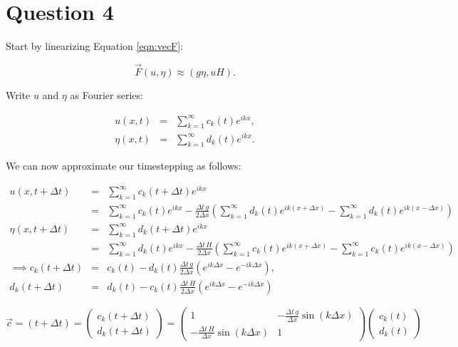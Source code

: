 \documentclass[a4paper,12pt]{article}
\begin{document}
\section{Question 4}

Start by linearizing Equation \ref{eqn:vecF}:

\begin{equation}
\vec{F}(u,\eta) \approx \left(g\eta,uH\right).
\end{equation}

Write $u$ and $\eta$ as Fourier series: 

\begin{eqnarray}
u(x,t) &=& \sum_{k=1}^{\infty}c_k(t) e^{ikx},\nonumber\\
\eta(x,t) &=& \sum_{k=1}^{\infty}d_k(t) e^{ikx}.\nonumber
\end{eqnarray}

We can now approximate our timestepping as follows:

\begin{eqnarray}
u(x,t+\Delta t) &=& \sum_{k=1}^{\infty}c_k(t+\Delta t)e^{ikx}\nonumber\\
&=& \sum_{k=1}^{\infty}c_k(t)e^{ikx} - \frac{\Delta t\,g}{2\Delta x}\left(\sum_{k=1}^{\infty}d_k(t)e^{ik(x+\Delta x)} - \sum_{k=1}^{\infty}d_k(t)e^{ik(x-\Delta x)}\right)\nonumber\\
\eta(x,t+\Delta t) &=& \sum_{k=1}^{\infty}d_k(t+\Delta t)e^{ikx}\nonumber\\
&=& \sum_{k=1}^{\infty}d_k(t)e^{ikx} - \frac{\Delta t\,H}{2\Delta x}\left(\sum_{k=1}^{\infty}c_k(t)e^{ik(x+\Delta x)} - \sum_{k=1}^{\infty}c_k(t)e^{ik(x-\Delta x)}\right)\nonumber\\
\implies c_k(t + \Delta t) &=& c_k(t) - d_k(t)\frac{\Delta t\, g}{2\Delta x}\left(e^{ik\Delta x} - e^{-ik\Delta x}\right),\nonumber\\
d_k(t + \Delta t) &=& d_k(t) - c_k(t)\frac{\Delta t\, H}{2\Delta x}\left(e^{ik\Delta x} - e^{-ik\Delta x}\right)\nonumber
\end{eqnarray}

\[ \vec{c} = (t+\Delta t) = \left( \begin{array}{c}
c_k(t+\Delta t) \\
d_k(t+\Delta t)  \end{array} \right)
= \left( \begin{array}{cc}
1 & -\frac{\Delta t\, g}{\Delta x}\sin(k\Delta x) \\
-\frac{\Delta t\, H}{\Delta x}\sin(k\Delta x) & 1  \end{array} \right) 
\left( \begin{array}{ccc}
c_k(t) \\
d_k(t)  \end{array} \right)\] 
\end{document}
